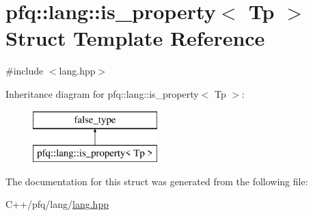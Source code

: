 \hypertarget{structpfq_1_1lang_1_1is__property}{}\section{pfq\+:\+:lang\+:\+:is\+\_\+property$<$ Tp $>$ Struct Template Reference}
\label{structpfq_1_1lang_1_1is__property}


{\ttfamily \#include $<$lang.\+hpp$>$}

Inheritance diagram for pfq\+:\+:lang\+:\+:is\+\_\+property$<$ Tp $>$\+:\begin{figure}[H]
\begin{center}
\leavevmode
\includegraphics[height=2.000000cm]{structpfq_1_1lang_1_1is__property}
\end{center}
\end{figure}


The documentation for this struct was generated from the following file\+:\begin{DoxyCompactItemize}
\item 
C++/pfq/lang/\hyperlink{lang_8hpp}{lang.\+hpp}\end{DoxyCompactItemize}
